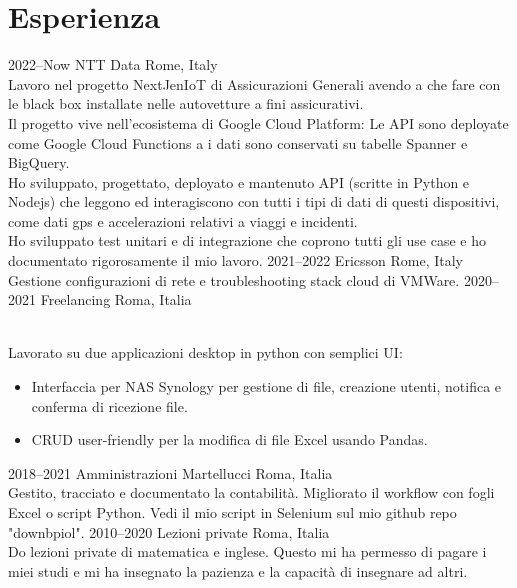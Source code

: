 \documentclass[]{cv-style}          %
\begin{document}
\section{Esperienza}

\begin{entrylist}
\entry
{2022--Now}
{NTT Data}
{Rome, Italy}
{\\
Lavoro nel progetto NextJenIoT di Assicurazioni Generali avendo a che fare con le black box installate nelle autovetture a fini assicurativi.\\
Il progetto vive nell'ecosistema di Google Cloud Platform: Le API sono deployate come Google Cloud Functions a i dati sono conservati su tabelle Spanner e BigQuery.\\
Ho sviluppato, progettato, deployato e mantenuto API (scritte in Python e Nodejs) che leggono ed interagiscono con tutti i tipi di dati di questi dispositivi, come dati gps e accelerazioni relativi a viaggi e incidenti.\\
Ho sviluppato test unitari e di integrazione che coprono tutti gli use case e ho documentato rigorosamente il mio lavoro.
}
\entry
{2021--2022}
{Ericsson}
{Rome, Italy}
{\\
Gestione configurazioni di rete e troubleshooting stack cloud di VMWare.}
\entry
  {2020--2021}
  {Freelancing}
  {Roma, Italia}
  {\\
  Lavorato su due applicazioni desktop in python con semplici UI:
  \begin{itemize}
  \item Interfaccia per NAS Synology per gestione di file, creazione utenti, notifica e conferma di ricezione file.
  \item CRUD user-friendly per la modifica di file Excel usando Pandas.
  \end{itemize}
}
\entry
  {2018--2021}
  {Amministrazioni Martellucci}
  {Roma, Italia}
  {\\
  Gestito, tracciato e documentato la contabilità. Migliorato il workflow con fogli Excel o script Python. Vedi il mio script in Selenium sul mio github repo "downbpiol".
}
\entry
  {2010--2020}
  {Lezioni private}
  {Roma, Italia}
  {\\
    Do lezioni private di matematica e inglese. Questo mi ha permesso di pagare i miei studi e mi ha insegnato la pazienza e la capacità di insegnare ad altri.
  }
\end{entrylist}
\end{document}

